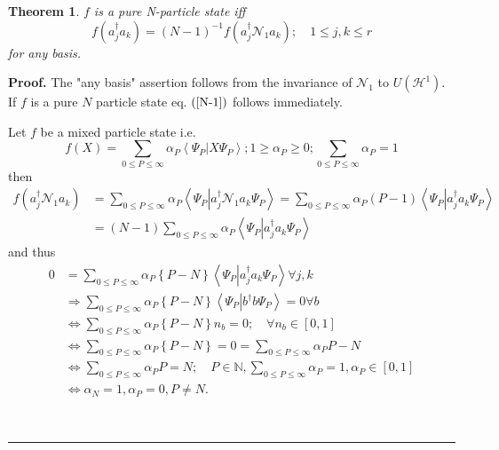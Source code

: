 \documentclass[aps,preprint]{revtex4}%
\newtheorem{theorem}{Theorem}
\newenvironment{proof}[1][Proof]{\noindent\textbf{#1.} }{\ \rule{0.5em}{0.5em}}
\begin{document}
\begin{theorem}
$f$ is a pure N-particle state iff
\begin{equation}
f\left(  a_{j}^{\dagger}a_{k}\right)  =\left(  N-1\right)  ^{-1}f\left(
a_{j}^{\dagger}\mathcal{N}_{1}a_{k}\right)  ;\quad1\leq j,k\leq r \label{N-1}%
\end{equation}
for any basis.
\end{theorem}

\begin{proof}
The "any basis" assertion follows from the invariance of $\mathcal{N}_{1}$ to
$U\left(  \mathcal{H}^{1}\right)  .$ If $f$ is a pure $N$ particle state eq.
$\left(  \ref{N-1}\right)  $ follows immediately.

Let $f$ be a mixed particle state i.e.
\begin{equation}
f\left(  X\right)  =\sum_{0\leq P\leq\infty}\alpha_{P}\left\langle \Psi
_{P}\left\vert X\Psi_{P}\right.  \right\rangle ;1\geq\alpha_{P}\geq
0;\sum_{0\leq P\leq\infty}\alpha_{P}=1
\end{equation}
then
\begin{align}
f\left(  a_{j}^{\dagger}\mathcal{N}_{1}a_{k}\right)   &  =\sum_{0\leq
P\leq\infty}\alpha_{P}\left\langle \Psi_{P}\left\vert a_{j}^{\dagger
}\mathcal{N}_{1}a_{k}\Psi_{P}\right.  \right\rangle =\sum_{0\leq P\leq\infty
}\alpha_{P}\left(  P-1\right)  \left\langle \Psi_{P}\left\vert a_{j}^{\dagger
}a_{k}\Psi_{P}\right.  \right\rangle \nonumber\\
&  =\left(  N-1\right)  \sum_{0\leq P\leq\infty}\alpha_{P}\left\langle
\Psi_{P}\left\vert a_{j}^{\dagger}a_{k}\Psi_{P}\right.  \right\rangle
\end{align}
and thus%
\begin{align}
0  &  =\sum_{0\leq P\leq\infty}\alpha_{P}\left\{  P-N\right\}  \left\langle
\Psi_{P}\left\vert a_{j}^{\dagger}a_{k}\Psi_{P}\right.  \right\rangle \forall
j,k\\
&  \Rightarrow\sum_{0\leq P\leq\infty}\alpha_{P}\left\{  P-N\right\}
\left\langle \Psi_{P}\left\vert b^{\dagger}b\Psi_{P}\right.  \right\rangle
=0\forall b\\
&  \Leftrightarrow\sum_{0\leq P\leq\infty}\alpha_{P}\left\{  P-N\right\}
n_{b}=0;\quad\forall n_{b}\in\left[  0,1\right] \\
&  \Leftrightarrow\sum_{0\leq P\leq\infty}\alpha_{P}\left\{  P-N\right\}
=0=\sum_{0\leq P\leq\infty}\alpha_{P}P-N\\
&  \Leftrightarrow\sum_{0\leq P\leq\infty}\alpha_{P}P=N;\quad P\in
\mathbb{N},\sum_{0\leq P\leq\infty}\alpha_{P}=1,\alpha_{P}\in\left[
0,1\right] \\
&  \Leftrightarrow\alpha_{N}=1,\alpha_{P}=0,P\neq N.
\end{align}

\end{proof}
\end{document}
